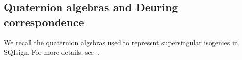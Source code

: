 \subsection{Quaternion algebras and Deuring correspondence}
\label{subsec:quaternion}

We recall the quaternion algebras used to represent supersingular isogenies
in SQIsign.
For more details, see~\cite{Voi21, Ler22}.



